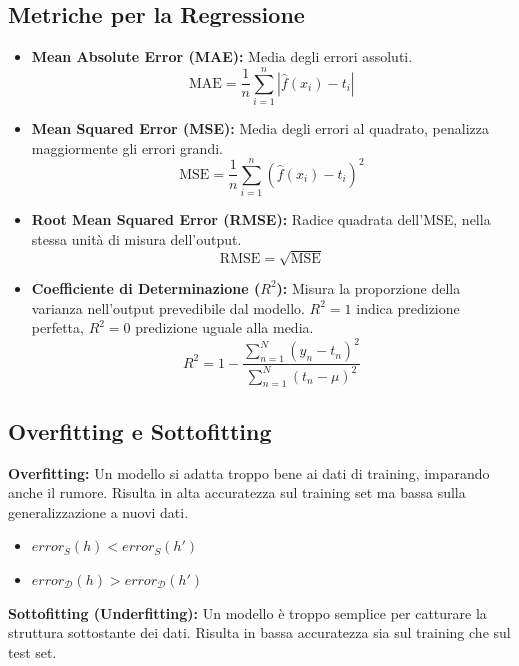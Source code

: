 \documentclass[a4paper,11pt]{article}
\begin{document}
\subsection{Metriche per la Regressione}
\begin{itemize}
    \item \textbf{Mean Absolute Error (MAE):} Media degli errori assoluti.
    \begin{equation}
        \text{MAE} = \frac{1}{n} \sum_{i=1}^n |\hat{f}(x_i) - t_i|
    \end{equation}
    \item \textbf{Mean Squared Error (MSE):} Media degli errori al quadrato, penalizza maggiormente gli errori grandi.
    \begin{equation}
        \text{MSE} = \frac{1}{n} \sum_{i=1}^n (\hat{f}(x_i) - t_i)^2
    \end{equation}
    \item \textbf{Root Mean Squared Error (RMSE):} Radice quadrata dell'MSE, nella stessa unità di misura dell'output.
    \begin{equation}
        \text{RMSE} = \sqrt{\text{MSE}}
    \end{equation}
    \item \textbf{Coefficiente di Determinazione ($R^2$):} Misura la proporzione della varianza nell'output prevedibile dal modello. $R^2=1$ indica predizione perfetta, $R^2=0$ predizione uguale alla media.
    \begin{equation}
        R^2 = 1 - \frac{\sum_{n=1}^N (y_n - t_n)^2}{\sum_{n=1}^N (t_n - \mu)^2}
    \end{equation}
\end{itemize}

\subsection{Overfitting e Sottofitting}
\textbf{Overfitting:} Un modello si adatta troppo bene ai dati di training, imparando anche il rumore. Risulta in alta accuratezza sul training set ma bassa sulla generalizzazione a nuovi dati.
\begin{itemize}
    \item $error_S(h) < error_S(h')$
    \item $error_{\mathcal{D}}(h) > error_{\mathcal{D}}(h')$
\end{itemize}
\textbf{Sottofitting (Underfitting):} Un modello è troppo semplice per catturare la struttura sottostante dei dati. Risulta in bassa accuratezza sia sul training che sul test set.
\end{document}
